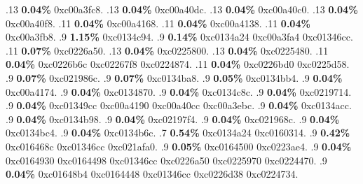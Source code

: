 \begin{profile}
{.13 \textbf{0.04\%} 0xc00a3fc8. 
.13 \textbf{0.04\%} 0xc00a40dc. 
.13 \textbf{0.04\%} 0xc00a40c0. 
.13 \textbf{0.04\%} 0xc00a40f8. 
.11 \textbf{0.04\%} 0xc00a4168. 
.11 \textbf{0.04\%} 0xc00a4138. 
.11 \textbf{0.04\%} 0xc00a3fb8. 
.9 \textbf{1.15\%} 0xc0134c94. 
.9 \textbf{0.14\%} 0xc0134a24\newline {} 0xc00a3fa4\newline {} 0xc01346cc. 
.11 \textbf{0.07\%} 0xc0226a50. 
.13 \textbf{0.04\%} 0xc0225800. 
.13 \textbf{0.04\%} 0xc0225480. 
.11 \textbf{0.04\%} 0xc0226b6c\newline {} 0xc02267f8\newline {} 0xc0224874. 
.11 \textbf{0.04\%} 0xc0226bd0\newline {} 0xc0225d58. 
.9 \textbf{0.07\%} 0xc021986c. 
.9 \textbf{0.07\%} 0xc0134ba8. 
.9 \textbf{0.05\%} 0xc0134bb4. 
.9 \textbf{0.04\%} 0xc00a4174. 
.9 \textbf{0.04\%} 0xc0134870. 
.9 \textbf{0.04\%} 0xc0134c8c. 
.9 \textbf{0.04\%} 0xc0219714. 
.9 \textbf{0.04\%} 0xc01349cc\newline {} 0xc00a4190\newline {} 0xc00a40cc\newline {} 0xc00a3ebc. 
.9 \textbf{0.04\%} 0xc0134acc. 
.9 \textbf{0.04\%} 0xc0134b98. 
.9 \textbf{0.04\%} 0xc02197f4. 
.9 \textbf{0.04\%} 0xc021968c. 
.9 \textbf{0.04\%} 0xc0134bc4. 
.9 \textbf{0.04\%} 0xc0134b6c. 
.7 \textbf{0.54\%} 0xc0134a24\newline {} 0xc0160314. 
.9 \textbf{0.42\%} 0xc016468c\newline {} 0xc01346cc\newline {} 0xc021afa0. 
.9 \textbf{0.05\%} 0xc0164500\newline {} 0xc0223ae4. 
.9 \textbf{0.04\%} 0xc0164930\newline {} 0xc0164498\newline {} 0xc01346cc\newline {} 0xc0226a50\newline {} 0xc0225970\newline {} 0xc0224470. 
.9 \textbf{0.04\%} 0xc01648b4\newline {} 0xc0164448\newline {} 0xc01346cc\newline {} 0xc0226d38\newline {} 0xc0224734. 
}
\end{profile}
